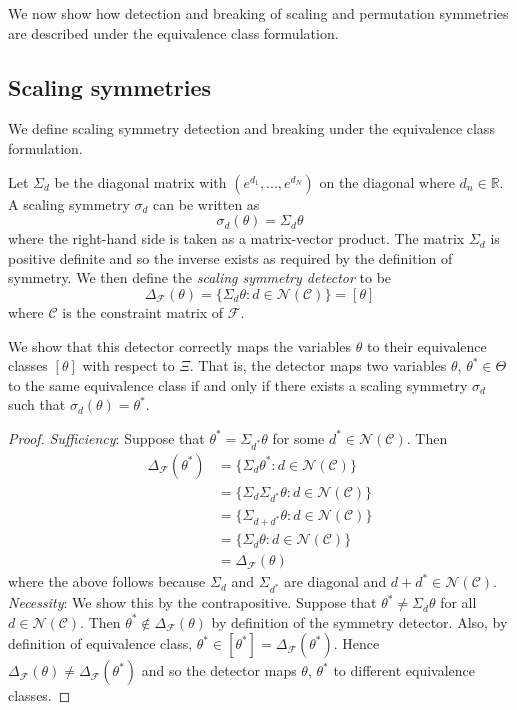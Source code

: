 We now show how detection and breaking of scaling and permutation symmetries are described under the equivalence class formulation.


\subsection{Scaling symmetries}

We define scaling symmetry detection and breaking under the equivalence class formulation.

\begin{defn}
Let $\Sigma_d$ be the diagonal matrix with $(e^{d_1},...,e^{d_N})$ on the diagonal where $d_n\in\mathbb{R}$. A scaling symmetry $\sigma_d$ can be written as
\[
\sigma_d(\theta)=\Sigma_d\theta
\]
where the right-hand side is taken as a matrix-vector product. The matrix $\Sigma_d$ is positive definite and so the inverse exists as required by the definition of symmetry. We then define the \textit{scaling symmetry detector} to be
\[
\Delta_\mathcal{F}(\theta) = \{\Sigma_d\theta:d\in\mathcal{N}(\mathcal{C})\}=[\theta]
\]
where $\mathcal{C}$ is the constraint matrix of $\mathcal{F}$.
\end{defn}

\noindent We show that this detector correctly maps the variables $\theta$ to their equivalence classes $[\theta]$ with respect to $\Xi$. That is, the detector maps two variables $\theta$, $\theta^*\in\Theta$ to the same equivalence class if and only if there exists a scaling symmetry $\sigma_d$ such that $\sigma_d(\theta)=\theta^*$.

\begin{proof}
\textit{Sufficiency}: Suppose that $\theta^*=\Sigma_{d^*}\theta$ for some $d^*\in\mathcal{N}(\mathcal{C})$. Then
\begin{align*}
\Delta_\mathcal{F}(\theta^*) &= \{\Sigma_d\theta^*:d\in\mathcal{N}(\mathcal{C})\} \\
&= \{\Sigma_d\Sigma_{d^*}\theta:d\in\mathcal{N}(\mathcal{C})\} \\
&= \{\Sigma_{d+d^*}\theta:d\in\mathcal{N}(\mathcal{C})\} \\
&= \{\Sigma_d\theta:d\in\mathcal{N}(\mathcal{C})\} \\
&= \Delta_\mathcal{F}(\theta)
\end{align*}
where the above follows because $\Sigma_d$ and $\Sigma_{d^*}$ are diagonal and $d+d^*\in\mathcal{N}(\mathcal{C})$.
\\

\noindent \textit{Necessity}: We show this by the contrapositive. Suppose that $\theta^*\neq\Sigma_{d}\theta$ for all $d\in\mathcal{N}(\mathcal{C})$. Then $\theta^*\notin\Delta_\mathcal{F}(\theta)$ by definition of the symmetry detector. Also, by definition of equivalence class, $\theta^*\in[\theta^*]=\Delta_\mathcal{F}(\theta^*)$. Hence $\Delta_\mathcal{F}(\theta)\neq\Delta_\mathcal{F}(\theta^*)$ and so the detector maps $\theta$, $\theta^*$ to different equivalence classes.
\end{proof}

